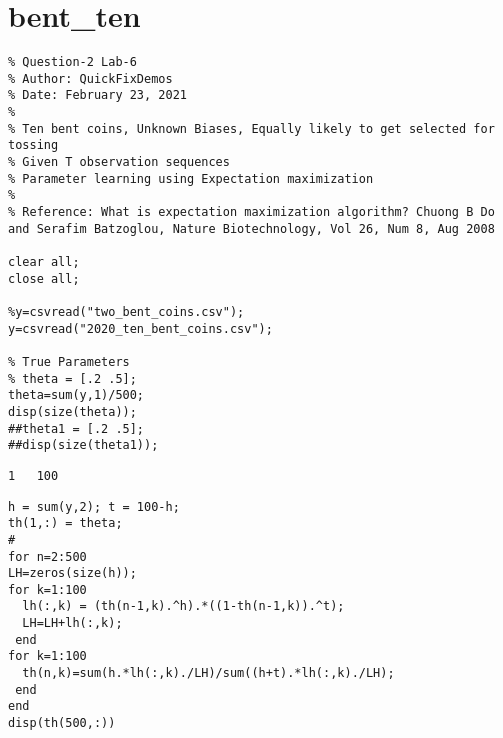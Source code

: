 \documentclass[10pt]{article}
\begin{document}
{\Huge\section*{bent\_ten}}

\tableofcontents
\vspace*{4em}

\begin{lstlisting}
% Question-2 Lab-6
% Author: QuickFixDemos
% Date: February 23, 2021
%
% Ten bent coins, Unknown Biases, Equally likely to get selected for tossing
% Given T observation sequences
% Parameter learning using Expectation maximization
%
% Reference: What is expectation maximization algorithm? Chuong B Do and Serafim Batzoglou, Nature Biotechnology, Vol 26, Num 8, Aug 2008

clear all;
close all;

%y=csvread("two_bent_coins.csv");
y=csvread("2020_ten_bent_coins.csv");

% True Parameters
% theta = [.2 .5];
theta=sum(y,1)/500;
disp(size(theta));
##theta1 = [.2 .5];
##disp(size(theta1));
\end{lstlisting}
\begin{lstlisting}[language={},xleftmargin=5pt,frame=none]
     1   100

\end{lstlisting}
\begin{lstlisting}
h = sum(y,2); t = 100-h;
th(1,:) = theta;
#
for n=2:500
LH=zeros(size(h));
for k=1:100
  lh(:,k) = (th(n-1,k).^h).*((1-th(n-1,k)).^t);
  LH=LH+lh(:,k);
 end
for k=1:100
  th(n,k)=sum(h.*lh(:,k)./LH)/sum((h+t).*lh(:,k)./LH);
 end
end
disp(th(500,:))
\end{lstlisting}
\end{document}
